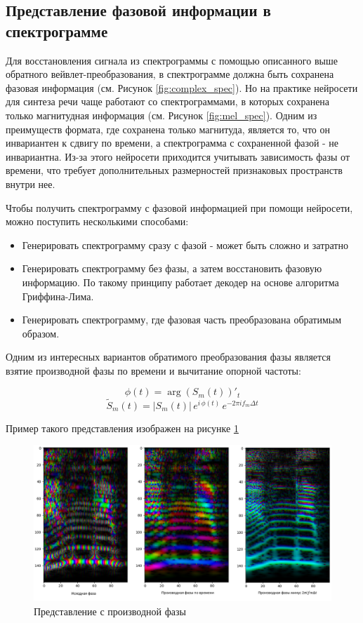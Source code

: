 \subsection{Представление фазовой информации в спектрограмме}

Для восстановления сигнала из спектрограммы с помощью описанного выше обратного вейвлет-преобразования, 
в спектрограмме должна быть сохранена фазовая информация (см. Рисунок \ref{fig:complex_spec}). 
Но на практике нейросети для синтеза речи чаще работают со спектрограммами, 
в которых сохранена только магнитудная информация (см. Рисунок \ref{fig:mel_spec}).
Одним из преимуществ формата, где сохранена только магнитуда, является то, что он инвариантен к сдвигу по времени, 
а спектрограмма с сохраненной фазой - не инвариантна. 
Из-за этого нейросети приходится учитывать зависимость фазы от времени, 
что требует дополнительных размерностей признаковых пространств внутри нее.

Чтобы получить спектрограмму с фазовой информацией при помощи нейросети, можно поступить несколькими способами:
\begin{itemize}
  \item Генерировать спектрограмму сразу с фазой - может быть сложно и затратно
  \item Генерировать спектрограмму без фазы, а затем восстановить фазовую информацию. 
    По такому принципу работает декодер на основе алгоритма Гриффина-Лима.
  \item Генерировать спектрограмму, где фазовая часть преобразована обратимым образом.
\end{itemize}

Одним из интересных вариантов обратимого преобразования фазы является взятие производной фазы по времени и вычитание опорной частоты:

\begin{equation}
  \phi(t) = \arg(S_m(t))'_t
\end{equation}
\[ \tilde{S}_m(t) = |S_m(t)|\,e^{i\,\phi(t)}  \, e^{- 2\pi i f_m \Delta t} \]

Пример такого представления изображен на рисунке \ref{fig:freq_diff_repr}

\begin{figure}
  \centering
  \includegraphics[width=0.8\linewidth]{figures/freq_diff_repr}
  \caption{Представление с производной фазы}
  \label{fig:freq_diff_repr}
\end{figure}

